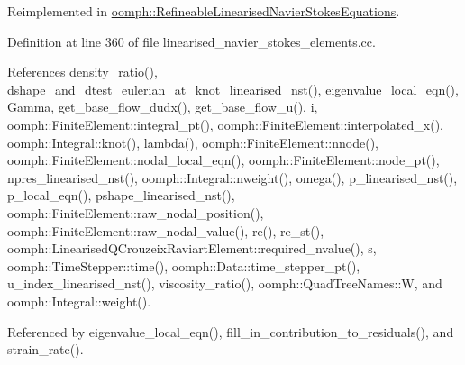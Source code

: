 Reimplemented in \hyperlink{classoomph_1_1RefineableLinearisedNavierStokesEquations_afb1a09529a1655020ff037c37f00b201}{oomph\+::\+Refineable\+Linearised\+Navier\+Stokes\+Equations}.



Definition at line 360 of file linearised\+\_\+navier\+\_\+stokes\+\_\+elements.\+cc.



References density\+\_\+ratio(), dshape\+\_\+and\+\_\+dtest\+\_\+eulerian\+\_\+at\+\_\+knot\+\_\+linearised\+\_\+nst(), eigenvalue\+\_\+local\+\_\+eqn(), Gamma, get\+\_\+base\+\_\+flow\+\_\+dudx(), get\+\_\+base\+\_\+flow\+\_\+u(), i, oomph\+::\+Finite\+Element\+::integral\+\_\+pt(), oomph\+::\+Finite\+Element\+::interpolated\+\_\+x(), oomph\+::\+Integral\+::knot(), lambda(), oomph\+::\+Finite\+Element\+::nnode(), oomph\+::\+Finite\+Element\+::nodal\+\_\+local\+\_\+eqn(), oomph\+::\+Finite\+Element\+::node\+\_\+pt(), npres\+\_\+linearised\+\_\+nst(), oomph\+::\+Integral\+::nweight(), omega(), p\+\_\+linearised\+\_\+nst(), p\+\_\+local\+\_\+eqn(), pshape\+\_\+linearised\+\_\+nst(), oomph\+::\+Finite\+Element\+::raw\+\_\+nodal\+\_\+position(), oomph\+::\+Finite\+Element\+::raw\+\_\+nodal\+\_\+value(), re(), re\+\_\+st(), oomph\+::\+Linearised\+Q\+Crouzeix\+Raviart\+Element\+::required\+\_\+nvalue(), s, oomph\+::\+Time\+Stepper\+::time(), oomph\+::\+Data\+::time\+\_\+stepper\+\_\+pt(), u\+\_\+index\+\_\+linearised\+\_\+nst(), viscosity\+\_\+ratio(), oomph\+::\+Quad\+Tree\+Names\+::W, and oomph\+::\+Integral\+::weight().



Referenced by eigenvalue\+\_\+local\+\_\+eqn(), fill\+\_\+in\+\_\+contribution\+\_\+to\+\_\+residuals(), and strain\+\_\+rate().

\mbox{\label{classoomph_1_1LinearisedNavierStokesEquations_ab4b45c111571d3904985dcefcae8ef67}} 
